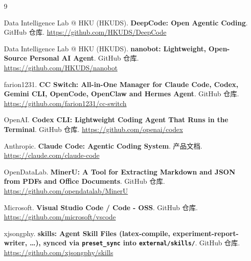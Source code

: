 \documentclass[a4paper,11pt]{article}
\begin{document}
\begin{thebibliography}{9}
\setlength{\itemsep}{2pt}

 Data Intelligence Lab @ HKU (HKUDS). \textbf{DeepCode: Open Agentic Coding}. GitHub 仓库. \url{https://github.com/HKUDS/DeepCode}

 Data Intelligence Lab @ HKU (HKUDS). \textbf{nanobot: Lightweight, Open-Source Personal AI Agent}. GitHub 仓库. \url{https://github.com/HKUDS/nanobot}

 farion1231. \textbf{CC Switch: All-in-One Manager for Claude Code, Codex, Gemini CLI, OpenCode, OpenClaw and Hermes Agent}. GitHub 仓库. \url{https://github.com/farion1231/cc-switch}

 OpenAI. \textbf{Codex CLI: Lightweight Coding Agent That Runs in the Terminal}. GitHub 仓库. \url{https://github.com/openai/codex}

 Anthropic. \textbf{Claude Code: Agentic Coding System}. 产品文档. \url{https://claude.com/claude-code}

 OpenDataLab. \textbf{MinerU: A Tool for Extracting Markdown and JSON from PDFs and Office Documents}. GitHub 仓库. \url{https://github.com/opendatalab/MinerU}

 Microsoft. \textbf{Visual Studio Code / Code - OSS}. GitHub 仓库. \url{https://github.com/microsoft/vscode}

 xjsongphy. \textbf{skills: Agent Skill Files (latex-compile, experiment-report-writer, \ldots), synced via \texttt{preset\_sync} into \texttt{external/skills/}}. GitHub 仓库. \url{https://github.com/xjsongphy/skills}

\end{thebibliography}
\end{document}
